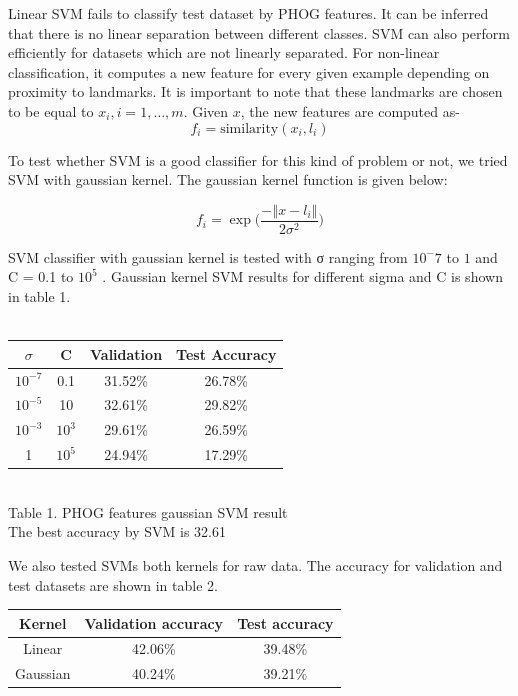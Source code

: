 \documentclass[10pt,twocolumn]{article}
\begin{document}
Linear SVM fails to classify test dataset by PHOG features. It can be inferred that there is no linear separation between different classes.
SVM can also perform efficiently for datasets which are not linearly separated. For non-linear classification, it computes a new feature for every given example depending on proximity to landmarks. It is important to note that these landmarks are chosen to be equal to $x_i, i=1,…,m$. Given $x$, the new features are computed as-
\[f_i=\text{similarity}(x_i,l_i)\]
 
To test whether SVM is a good classifier for this kind of problem or not, we tried SVM with gaussian kernel. The gaussian kernel function is given below:

\[f_i=\exp\Big(\frac{-‖x-l_i ‖}{2\sigma^2 }\Big)\]

SVM classifier with gaussian kernel is tested with σ ranging from $10^-7$ to $1$ and C = 0.1 to $10^5$ \cite {larochelle2007empirical}. Gaussian kernel SVM results for different sigma and C is shown in table 1.
\\
\\
\begin{tabular}{|c|c|c|c|}
\hline
$\sigma$ & C &	Validation & Test Accuracy \\
\hline
$10^{-7}$  & 0.1	& 31.52\%	& 26.78\% \\
$10^{-5}$	 & 10	& 32.61\%	& 29.82\% \\
$10^{-3}$	 & $10^3$ & 29.61\%	& 26.59\% \\
1        &$10^5$ & 	24.94\% & 	17.29\% \\
\hline
\end{tabular}
\\

Table 1. PHOG features gaussian SVM result
\\

The best accuracy by SVM is 32.61%

We also tested SVMs both kernels for raw data. The accuracy for validation and test datasets are shown in table 2.
\\

\begin{tabular}{|c|c|c|}
\hline
Kernel & Validation accuracy & Test accuracy \\ \hline
Linear & 42.06\% & 39.48\% \\
Gaussian & 40.24\% & 39.21\% \\
\hline
\end{tabular}
\\
\end{document}
